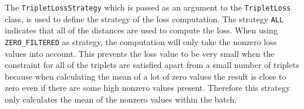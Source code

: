 \newline
\newline
The \texttt{TripletLossStrategy} which is passed as an argument to the \texttt{TripletLoss} class, is used to define the strategy of the loss computation. The strategy \texttt{ALL} indicates that all of the distances are used to compute the loss. When using \texttt{ZERO\_FILTERED} as strategy, the computation will only take the nonzero loss values into account. This prevents the loss value to be very small when the constraint for all of the triplets are satisfied apart from a small number of triplets because when calculating the mean of a lot of zero values the result is close to zero even if there are some high nonzero values present. Therefore this strategy only calculates the mean of the nonzero values within the batch.

